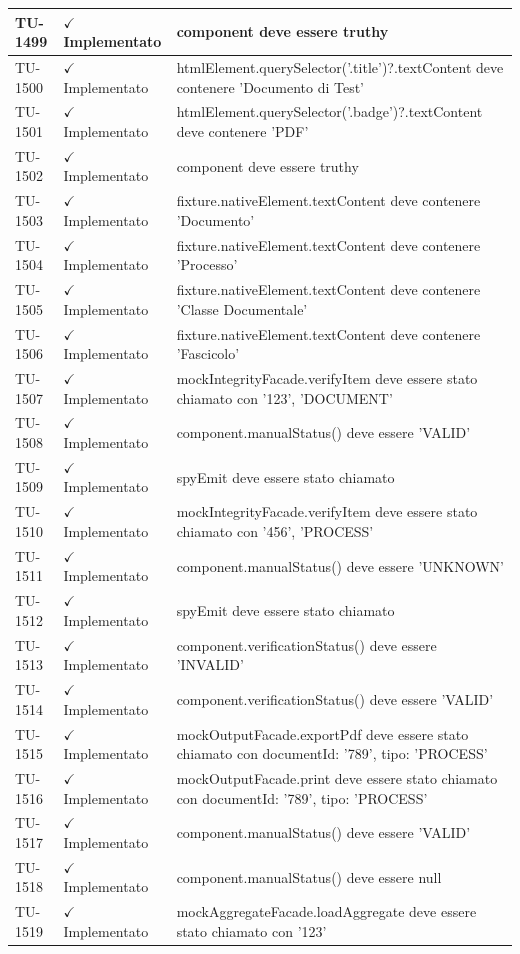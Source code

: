 ﻿\documentclass[a4paper,12pt]{article}
\newcommand{\ok}{\textcolor{green!60!black}{$\checkmark$ Implementato}}
\begin{document}
\begin{longtable}{|p{2cm}|p{3.5cm}|p{9.5cm}|}
\hline
TU-1499 & \ok & component deve essere truthy \\
\hline
TU-1500 & \ok & htmlElement.querySelector('.title')?.textContent deve contenere 'Documento di Test' \\
\hline
TU-1501 & \ok & htmlElement.querySelector('.badge')?.textContent deve contenere 'PDF' \\
\hline
TU-1502 & \ok & component deve essere truthy \\
\hline
TU-1503 & \ok & fixture.nativeElement.textContent deve contenere 'Documento' \\
\hline
TU-1504 & \ok & fixture.nativeElement.textContent deve contenere 'Processo' \\
\hline
TU-1505 & \ok & fixture.nativeElement.textContent deve contenere 'Classe Documentale' \\
\hline
TU-1506 & \ok & fixture.nativeElement.textContent deve contenere 'Fascicolo' \\
\hline
TU-1507 & \ok & mockIntegrityFacade.verifyItem deve essere stato chiamato con '123', 'DOCUMENT' \\
\hline
TU-1508 & \ok & component.manualStatus() deve essere 'VALID' \\
\hline
TU-1509 & \ok & spyEmit deve essere stato chiamato \\
\hline
TU-1510 & \ok & mockIntegrityFacade.verifyItem deve essere stato chiamato con '456', 'PROCESS' \\
\hline
TU-1511 & \ok & component.manualStatus() deve essere 'UNKNOWN' \\
\hline
TU-1512 & \ok & spyEmit deve essere stato chiamato \\
\hline
TU-1513 & \ok & component.verificationStatus() deve essere 'INVALID' \\
\hline
TU-1514 & \ok & component.verificationStatus() deve essere 'VALID' \\
\hline
TU-1515 & \ok & mockOutputFacade.exportPdf deve essere stato chiamato con { documentId: '789', tipo: 'PROCESS' } \\
\hline
TU-1516 & \ok & mockOutputFacade.print deve essere stato chiamato con { documentId: '789', tipo: 'PROCESS' } \\
\hline
TU-1517 & \ok & component.manualStatus() deve essere 'VALID' \\
\hline
TU-1518 & \ok & component.manualStatus() deve essere null \\
\hline
TU-1519 & \ok & mockAggregateFacade.loadAggregate deve essere stato chiamato con '123' \\

\end{longtable}
\end{document}
